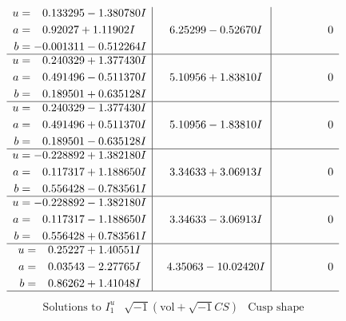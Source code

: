 \documentclass[1p]{elsarticle_modified}
\theoremstyle{definition}
\newcommand{\I}{\sqrt{-1}}
\begin{document}
$$\begin{array}{c|c|c}
\begin{aligned}
u &= \phantom{-}0.133295 - 1.380780 I \\
a &= \phantom{-}0.92027 + 1.11902 I \\
b &= -0.001311 - 0.512264 I\end{aligned}
 & \phantom{-}6.25299 - 0.52670 I & \phantom{-0.000000 } 0 \\ \hline\begin{aligned}
u &= \phantom{-}0.240329 + 1.377430 I \\
a &= \phantom{-}0.491496 - 0.511370 I \\
b &= \phantom{-}0.189501 + 0.635128 I\end{aligned}
 & \phantom{-}5.10956 + 1.83810 I & \phantom{-0.000000 } 0 \\ \hline\begin{aligned}
u &= \phantom{-}0.240329 - 1.377430 I \\
a &= \phantom{-}0.491496 + 0.511370 I \\
b &= \phantom{-}0.189501 - 0.635128 I\end{aligned}
 & \phantom{-}5.10956 - 1.83810 I & \phantom{-0.000000 } 0 \\ \hline\begin{aligned}
u &= -0.228892 + 1.382180 I \\
a &= \phantom{-}0.117317 + 1.188650 I \\
b &= \phantom{-}0.556428 - 0.783561 I\end{aligned}
 & \phantom{-}3.34633 + 3.06913 I & \phantom{-0.000000 } 0 \\ \hline\begin{aligned}
u &= -0.228892 - 1.382180 I \\
a &= \phantom{-}0.117317 - 1.188650 I \\
b &= \phantom{-}0.556428 + 0.783561 I\end{aligned}
 & \phantom{-}3.34633 - 3.06913 I & \phantom{-0.000000 } 0 \\ \hline\begin{aligned}
u &= \phantom{-}0.25227 + 1.40551 I \\
a &= \phantom{-}0.03543 - 2.27765 I \\
b &= \phantom{-}0.86262 + 1.41048 I\end{aligned}
 & \phantom{-}4.35063 - 10.02420 I & \phantom{-0.000000 } 0\\
 \hline 
 \end{array}$$\newpage$$\begin{array}{c|c|c}  
\text{Solutions to }I^u_{1}& \I (\text{vol} + \sqrt{-1}CS) & \text{Cusp shape}\\

\end{array}$$
\end{document}

